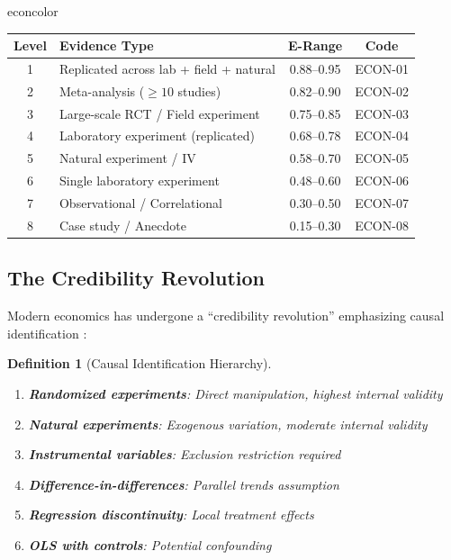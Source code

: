 \documentclass[11pt,a4paper]{article}
\newtheorem{definition}{Definition}[section]
\theoremstyle{remark}
\begin{document}
\begin{disciplinebox}{econcolor}
\begin{center}
\begin{tabular}{clcc}
\toprule
\textbf{Level} & \textbf{Evidence Type} & \textbf{E-Range} & \textbf{Code} \\
\midrule
1 & Replicated across lab + field + natural & 0.88--0.95 & ECON-01 \\
2 & Meta-analysis ($\geq 10$ studies) & 0.82--0.90 & ECON-02 \\
3 & Large-scale RCT / Field experiment & 0.75--0.85 & ECON-03 \\
4 & Laboratory experiment (replicated) & 0.68--0.78 & ECON-04 \\
5 & Natural experiment / IV & 0.58--0.70 & ECON-05 \\
6 & Single laboratory experiment & 0.48--0.60 & ECON-06 \\
7 & Observational / Correlational & 0.30--0.50 & ECON-07 \\
8 & Case study / Anecdote & 0.15--0.30 & ECON-08 \\
\bottomrule
\end{tabular}
\end{center}
\end{disciplinebox}

\subsection{The Credibility Revolution}

Modern economics has undergone a ``credibility revolution'' emphasizing causal identification \citep{Angrist2010}:

\begin{definition}[Causal Identification Hierarchy]
\label{def:causal-id}
\begin{enumerate}
    \item \textbf{Randomized experiments}: Direct manipulation, highest internal validity
    \item \textbf{Natural experiments}: Exogenous variation, moderate internal validity
    \item \textbf{Instrumental variables}: Exclusion restriction required
    \item \textbf{Difference-in-differences}: Parallel trends assumption
    \item \textbf{Regression discontinuity}: Local treatment effects
    \item \textbf{OLS with controls}: Potential confounding
\end{enumerate}
\end{definition}
\end{document}
